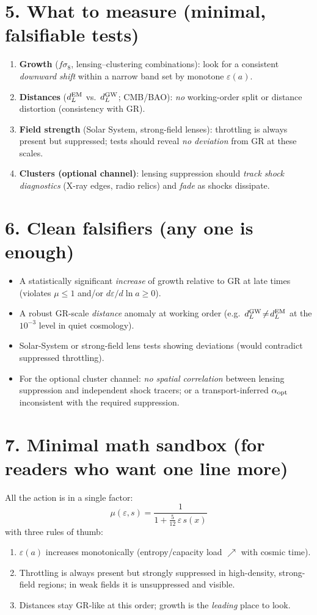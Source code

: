 \documentclass[aps,prd,onecolumn,superscriptaddress,nofootinbib]{revtex4-2}
\newcommand{\eps}{\varepsilon}
\begin{document}
\section*{5. What to measure (minimal, falsifiable tests)}
\begin{enumerate}
\item \textbf{Growth} ($f\sigma_8$, lensing--clustering combinations): look for a consistent \emph{downward shift} within a narrow band set by monotone $\eps(a)$.
\item \textbf{Distances} ($d_L^{\rm EM}$ vs.\ $d_L^{\rm GW}$; CMB/BAO): \emph{no} working-order split or distance distortion (consistency with GR).
\item \textbf{Field strength} (Solar System, strong-field lenses): throttling is always present but suppressed; tests should reveal \emph{no deviation} from GR at these scales.
\item \textbf{Clusters (optional channel)}: lensing suppression should \emph{track shock diagnostics} (X-ray edges, radio relics) and \emph{fade} as shocks dissipate.
\end{enumerate}

\section*{6. Clean falsifiers (any one is enough)}
\begin{itemize}
\item A statistically significant \emph{increase} of growth relative to GR at late times (violates $\mu\le 1$ and/or $d\eps/d\ln a\ge 0$).
\item A robust GR-scale \emph{distance} anomaly at working order (e.g.\ $d_L^{\rm GW}\!\neq\!d_L^{\rm EM}$ at the $10^{-3}$ level in quiet cosmology).
\item Solar-System or strong-field lens tests showing deviations (would contradict suppressed throttling).
\item For the optional cluster channel: \emph{no spatial correlation} between lensing suppression and independent shock tracers; or a transport-inferred $\alpha_{\rm opt}$ inconsistent with the required suppression.
\end{itemize}

\section*{7. Minimal math sandbox (for readers who want one line more)}
All the action is in a single factor:
\[
\boxed{\quad \mu(\eps,s)=\frac{1}{1+\frac{5}{12}\,\eps\,s(x)} \quad}
\]
with three rules of thumb:
\begin{enumerate}
\item $\eps(a)$ increases monotonically (entropy/capacity load $\nearrow$ with cosmic time).
\item Throttling is always present but strongly suppressed in high-density, strong-field regions; in weak fields it is unsuppressed and visible.
\item Distances stay GR-like at this order; growth is the \emph{leading} place to look.
\end{enumerate}
\end{document}
